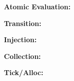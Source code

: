 \documentclass[12pt,draft]{article}
\begin{document}
\begin{multicols*}{2}
\begin{center}
\end{center}
\vspace{-10mm}
\begin{center}
\textbf{Atomic Evaluation:}
\end{center}
\vspace{-10mm}
\begin{center}
\textbf{Transition:}
\end{center}
\vspace{-10mm}
\begin{center}
\textbf{Injection:}
\end{center}
\vspace{-10mm}
\begin{center}
\textbf{Collection:}
\end{center}
\vspace{-10mm}
\begin{center}
\textbf{Tick/Alloc:}
\end{center}
\vspace{-10mm}


\vfill\null
\columnbreak



\end{multicols*}
\end{document}
